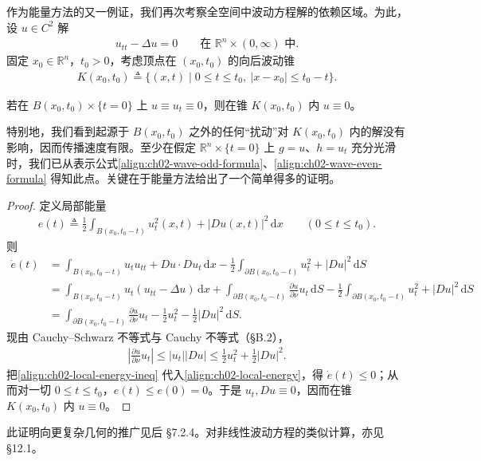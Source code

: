 \documentclass[../../main.tex]{subfiles}
\begin{document}
作为能量方法的又一例证，我们再次考察全空间中波动方程解的依赖区域。为此，设 $u\in C^2$ 解
\begin{align*}
u_{tt}-\Delta u=0 \qquad \text{在 }\mathbb{R}^n\times(0,\infty)\text{ 中}.
\end{align*}
固定 $x_0\in\mathbb{R}^n$，$t_0>0$，考虑顶点在 $(x_0,t_0)$ 的向后波动锥
\begin{align*}
K(x_0,t_0)\triangleq\{(x,t)\mid 0\leqslant t\leqslant t_0,\ |x-x_0|\leqslant t_0-t\}.
\end{align*}

\begin{theorem}[有限传播速度]\label{theorem:ch02-wave-finite-speed}若在 $B(x_0,t_0)\times\{t=0\}$ 上 $u\equiv u_t\equiv 0$，则在锥 $K(x_0,t_0)$ 内 $u\equiv 0$。
\end{theorem}

特别地，我们看到起源于 $B(x_0,t_0)$ 之外的任何``扰动''对 $K(x_0,t_0)$ 内的解没有影响，因而传播速度有限。至少在假定 $\mathbb{R}^n\times\{t=0\}$ 上 $g=u$、$h=u_t$ 充分光滑时，我们已从表示公式\eqref{align:ch02-wave-odd-formula}、\eqref{align:ch02-wave-even-formula} 得知此点。关键在于能量方法给出了一个简单得多的证明。

\begin{proof}
定义局部能量
\begin{align*}
e(t)\triangleq\frac{1}{2}\int_{B(x_0,t_0-t)}u_t^2(x,t)+|Du(x,t)|^2\,\mathrm{d}x \qquad (0\leqslant t\leqslant t_0).
\end{align*}
则
\begin{align}\label{align:ch02-local-energy}
\dot{e}(t)&=\int_{B(x_0,t_0-t)}u_t u_{tt}+Du\cdot Du_t\,\mathrm{d}x
-\frac{1}{2}\int_{\partial B(x_0,t_0-t)}u_t^2+|Du|^2\,\mathrm{d}S\\
&=\int_{B(x_0,t_0-t)}u_t(u_{tt}-\Delta u)\,\mathrm{d}x
+\int_{\partial B(x_0,t_0-t)}\frac{\partial u}{\partial\nu}u_t\,\mathrm{d}S
-\frac{1}{2}\int_{\partial B(x_0,t_0-t)}u_t^2+|Du|^2\,\mathrm{d}S\nonumber\\
&=\int_{\partial B(x_0,t_0-t)}\frac{\partial u}{\partial\nu}u_t-\frac{1}{2}u_t^2-\frac{1}{2}|Du|^2\,\mathrm{d}S.\nonumber
\end{align}
现由 Cauchy--Schwarz 不等式与 Cauchy 不等式（\S B.2），
\begin{align}\label{align:ch02-local-energy-ineq}
\left|\frac{\partial u}{\partial\nu}u_t\right|\leqslant|u_t||Du|\leqslant\frac{1}{2}u_t^2+\frac{1}{2}|Du|^2.
\end{align}
把\eqref{align:ch02-local-energy-ineq} 代入\eqref{align:ch02-local-energy}，得 $\dot{e}(t)\leqslant 0$；从而对一切 $0\leqslant t\leqslant t_0$，$e(t)\leqslant e(0)=0$。于是 $u_t,Du\equiv 0$，因而在锥 $K(x_0,t_0)$ 内 $u\equiv 0$。
\end{proof}

此证明向更复杂几何的推广见后 \S7.2.4。对非线性波动方程的类似计算，亦见 \S12.1。
\end{document}
